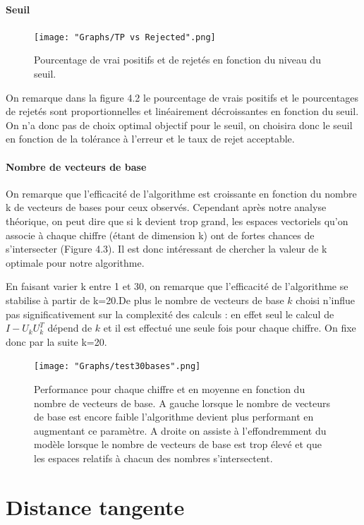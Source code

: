 \documentclass[a4paper,11pt,twoside]{report}
\begin{document}
\subsubsection{Seuil}
\begin{figure}[H]
  	\texttt{[image: "Graphs/TP vs Rejected".png]}
  	\caption{Pourcentage de vrai positifs et de rejetés en fonction du niveau du seuil.}
\end{figure}

On remarque dans la figure 4.2 le pourcentage de vrais positifs et le pourcentages de rejetés sont proportionnelles et linéairement décroissantes en fonction du seuil. On n'a donc pas de choix optimal objectif pour le seuil, on choisira donc le seuil en fonction de la tolérance à l'erreur et le taux de rejet acceptable. 

\subsubsection{Nombre de vecteurs de base}

On remarque que l'efficacité de l'algorithme est croissante en fonction du nombre k de vecteurs de bases pour ceux observés. Cependant après notre analyse théorique, on peut dire que si k devient trop grand, les espaces vectoriels qu'on associe à chaque chiffre (étant de dimension k) ont de fortes chances de s'intersecter (Figure 4.3). Il est donc intéressant de chercher la valeur de k optimale pour notre algorithme.


En faisant varier k entre 1 et 30, on remarque que l'efficacité de l'algorithme se stabilise à partir de k=20.De plus le nombre de vecteurs de base $k$ choisi n'influe pas significativement sur la complexité des calculs : en effet seul le calcul de $I-U_{k}U_{k}^{T}$ dépend de $k$ et il est effectué une seule fois pour chaque chiffre. On fixe donc par la suite k=20.

\begin{figure}[H]
  	\texttt{[image: "Graphs/test30bases".png]}
  	\caption{Performance pour chaque chiffre et en moyenne en fonction du nombre de vecteurs de base. A gauche lorsque le nombre de vecteurs de base est encore faible l'algorithme devient plus performant en augmentant ce paramètre. A droite on assiste à l'effondremment du modèle lorsque le nombre de vecteurs de base est trop élevé et que les espaces relatifs à chacun des nombres s'intersectent.}
\end{figure}


\chapter{Distance tangente}
\end{document}
